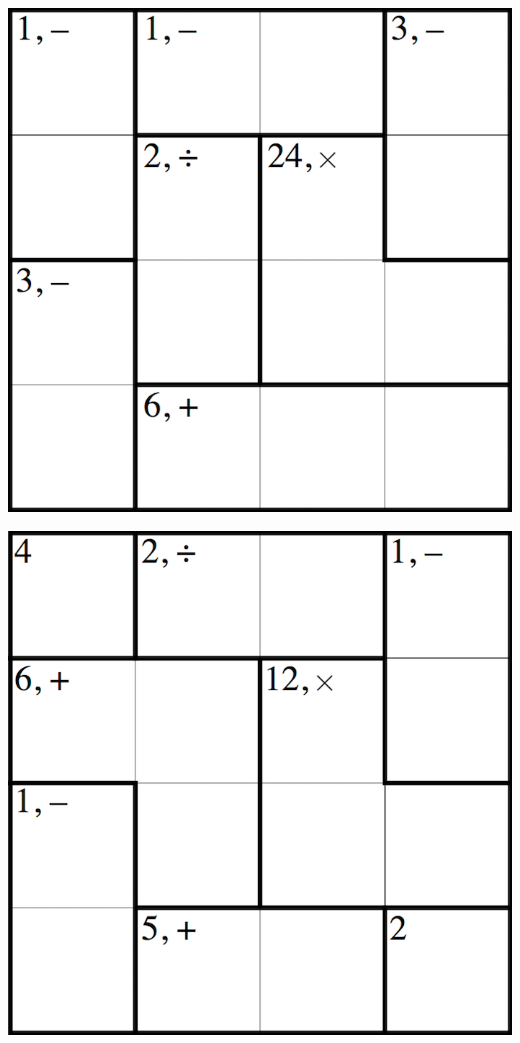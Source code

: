 
\includegraphics[scale=1]{Gambar/Lampiran/4x4_1.png}

\includegraphics[scale=1]{Gambar/Lampiran/4x4_2.png}
